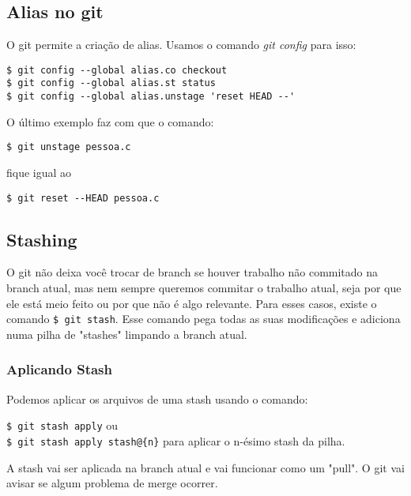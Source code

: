 \documentclass{article}
\begin{document}
\subsection{Alias no git}
    O git permite a criação de alias. Usamos o comando \emph{git config} para isso:
    \begin{tabbing}
        \hspace{1cm}\=\verb#$ git config --global alias.co checkout #\\
                    \>\verb#$ git config --global alias.st status #\\
                    \>\verb#$ git config --global alias.unstage 'reset HEAD --'#
    \end{tabbing}
    
    O último exemplo faz com que o comando:
    \begin{tabbing}
        \hspace{1cm}\=\verb#$ git unstage pessoa.c#
    \end{tabbing}
    fique igual ao
    \begin{tabbing}
        \hspace{1cm}\=\verb#$ git reset --HEAD pessoa.c#
    \end{tabbing}
    
\subsection{Stashing}
    O git não deixa você trocar de branch se houver trabalho não commitado na branch atual, mas nem sempre
queremos commitar o trabalho atual, seja por que ele está meio feito ou por que não é algo relevante. Para
esses casos, existe o comando \verb#$ git stash#. Esse comando pega todas as suas modificações e adiciona
numa pilha de "stashes" limpando a branch atual.

\subsubsection{Aplicando Stash}
    Podemos aplicar os arquivos de uma stash usando o comando:
    \begin{tabbing}
        \hspace{1cm}\=\verb#$ git stash apply# ou\\
                    \>\verb#$ git stash apply stash@{n}# para aplicar o n-ésimo stash da pilha.
    \end{tabbing}
    
    A stash vai ser aplicada na branch atual e vai funcionar como um "pull". O git vai avisar se
algum problema de merge ocorrer.
\end{document}
